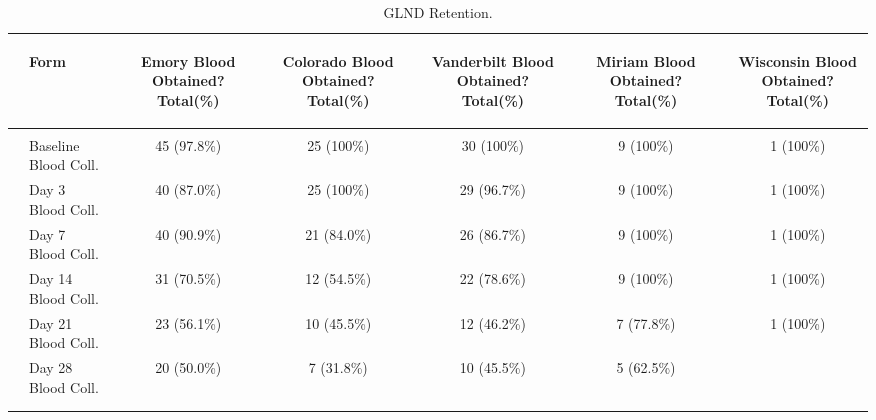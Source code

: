 \documentclass[dvips,10pt]{article}
\begin{document}
\clearpage
\begin{table}[t]
\caption
{ GLND Retention. }
\begin{center}
\begin{tabular}{ @{}l@{}
@{}l@{}@{}p{1.5em}@{}@{}c@{}@{}p{1.5em}@{}@{}c@{}@{}p{1.5em}@{}@{}c@{}@{}p{1.5em}@{}@{}c@{}@{}p{1.5em}@{}@{}c@{}
}
\hline

& \parbox{6em}{\begin{center}Form\end{center}} && \parbox{6em}{\begin{center}Emory Blood Obtained? Total(\%)\end{center}} && \parbox{6em}{\begin{center}Colorado Blood Obtained? Total(\%)\end{center}} && \parbox{6em}{\begin{center}Vanderbilt Blood Obtained? Total(\%)\end{center}} && \parbox{6em}{\begin{center}Miriam Blood Obtained? Total(\%)\end{center}} && \parbox{6em}{\begin{center}Wisconsin Blood Obtained? Total(\%)\end{center}} \\

\hline

\\
& Baseline Blood Coll. && 45 (97.8\%) && 25 (100\%) && 30 (100\%) && 9 (100\%) && 1 (100\%) \\
& Day 3 Blood Coll. && 40 (87.0\%) && 25 (100\%) && 29 (96.7\%) && 9 (100\%) && 1 (100\%) \\
& Day 7 Blood Coll. && 40 (90.9\%) && 21 (84.0\%) && 26 (86.7\%) && 9 (100\%) && 1 (100\%) \\
& Day 14 Blood Coll. && 31 (70.5\%) && 12 (54.5\%) && 22 (78.6\%) && 9 (100\%) && 1 (100\%) \\
& Day 21 Blood Coll. && 23 (56.1\%) && 10 (45.5\%) && 12 (46.2\%) && 7 (77.8\%) && 1 (100\%) \\
& Day 28 Blood Coll. && 20 (50.0\%) && 7 (31.8\%) && 10 (45.5\%) && 5 (62.5\%) &&  \\
\\
\hline \\

\end{tabular}

\end{center}
 \end{table}
\clearpage
\end{document}
